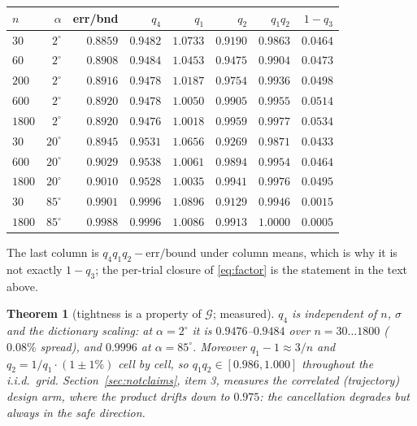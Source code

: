 \documentclass[11pt]{article}
\newtheorem{theorem}{Theorem}[section]
\theoremstyle{remark}
\newcommand{\Gr}{\mathcal{G}}
\begin{document}
\begin{center}\begin{tabular}{lrrrrrrr}
\toprule $n$ & $\alpha$ & err/bnd & $q_4$ & $q_1$ & $q_2$ & $q_1q_2$ & $1-q_3$\\
\midrule
$30$   & $2^\circ$ & $0.8859$ & $0.9482$ & $\mathbf{1.0733}$ & $\mathbf{0.9190}$ & $0.9863$ & $0.0464$\\
$60$   & $2^\circ$ & $0.8908$ & $0.9484$ & $1.0453$ & $0.9475$ & $0.9904$ & $0.0473$\\
$200$  & $2^\circ$ & $0.8916$ & $0.9478$ & $1.0187$ & $0.9754$ & $0.9936$ & $0.0498$\\
$600$  & $2^\circ$ & $0.8920$ & $0.9478$ & $1.0050$ & $0.9905$ & $0.9955$ & $0.0514$\\
$1800$ & $2^\circ$ & $0.8920$ & $0.9476$ & $1.0018$ & $0.9959$ & $0.9977$ & $0.0534$\\
$30$   & $20^\circ$& $0.8945$ & $0.9531$ & $1.0656$ & $0.9269$ & $0.9871$ & $0.0433$\\
$600$  & $20^\circ$& $0.9029$ & $0.9538$ & $1.0061$ & $0.9894$ & $0.9954$ & $0.0464$\\
$1800$ & $20^\circ$& $0.9010$ & $0.9528$ & $1.0035$ & $0.9941$ & $0.9976$ & $0.0495$\\
$30$   & $85^\circ$& $0.9901$ & $0.9996$ & $1.0896$ & $0.9129$ & $0.9946$ & $0.0015$\\
$1800$ & $85^\circ$& $0.9988$ & $0.9996$ & $1.0086$ & $0.9913$ & $1.0000$ & $0.0005$\\
\bottomrule
\end{tabular}\end{center}
\noindent The last column is $q_4q_1q_2-\text{err}/\text{bound}$ under column means, which
is why it is not exactly $1-q_3$; the per-trial closure of \eqref{eq:factor} is the
statement in the text above.

\begin{theorem}[tightness is a property of $\Gr$; measured]\label{thm:cancel}
$q_4$ is independent of $n$, $\sigma$ and the dictionary scaling: at $\alpha=2^\circ$ it
is $0.9476$--$0.9484$ over $n=30\ldots1800$ ($0.08\%$ spread), and $0.9996$ at
$\alpha=85^\circ$. Moreover $q_1-1\approx3/n$ and $q_2=1/q_1\cdot(1\pm1\%)$ cell by cell,
so $q_1q_2\in[0.986,1.000]$ throughout the i.i.d.\ grid. Section~\ref{sec:notclaims},
item 3, measures the correlated (trajectory) design arm, where the product drifts down to
$0.975$: the cancellation degrades but always in the safe direction.
\end{theorem}
\end{document}
